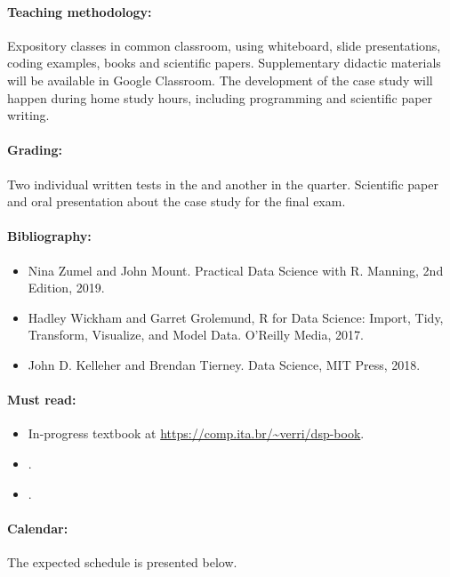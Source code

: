 \paragraph{Teaching methodology:}
Expository classes in common classroom, using whiteboard, slide presentations, coding
examples, books and scientific papers. Supplementary didactic materials will be available
in Google Classroom. The development of the case study will happen during home study
hours, including programming and scientific paper writing.

\paragraph{Grading:} Two individual written tests in the  and another in the  quarter.
Scientific paper and oral presentation about the case study for the final exam.

\paragraph{Bibliography:}
\begin{itemize}
  \item Nina Zumel and John Mount. Practical Data Science with R. Manning, 2nd Edition, 2019.
  \item Hadley Wickham and Garret Grolemund, R for Data Science: Import, Tidy, Transform, Visualize, and Model Data. O’Reilly Media, 2017.
  \item John D. Kelleher and Brendan Tierney. Data Science, MIT Press, 2018.
\end{itemize}

\paragraph{Must read:}
\begin{itemize}
  \item In-progress textbook at \url{https://comp.ita.br/~verri/dsp-book}.
  \item {}.
  \item {}.
\end{itemize}
\thispagestyle{empty}

\paragraph{Calendar:} The expected schedule is presented below.

